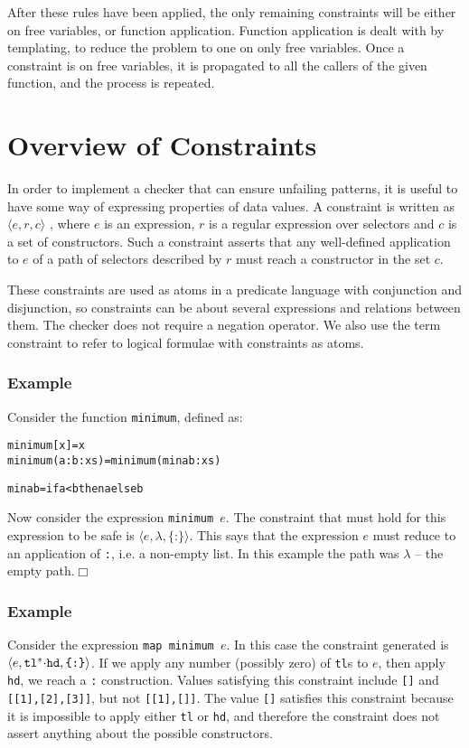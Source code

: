 \documentclass[preprint]{sigplanconf}
\newcommand{\T}[1]{\texttt{#1}}
\newcommand{\tup}[1]{\ensuremath{\langle #1 \rangle}}
\newcounter{exmp}
\newcommand{\yesexample}{\subsubsection*{Example \arabic{exmp}}\addtocounter{exmp}{1}}
\newcommand{\noexample}{\hfill$\Box$}
\newenvironment{code}{\begin{alltt}\small}{\end{alltt}}
\newcommand{\K}{\ensuremath{^\ast}} %
\newcommand{\D}{\ensuremath{\cdot}} %
\renewcommand{\c}[3]{\tup{\T{#1},\T{#2},\T{\{#3\}}}}
\newcommand{\cc}[2]{\c{#1}{$\lambda$}{#2}}
\begin{document}
After these rules have been applied, the only remaining constraints will be
either on free variables, or function application. Function application is
dealt with by templating, to reduce the problem to one on only free variables.
Once a constraint is on free variables, it is propagated to all the callers of
the given function, and the process is repeated.



\section{Overview of Constraints}

In order to implement a checker that can ensure unfailing patterns,
it is useful to have some way of expressing properties of data
values. A constraint is written as $\tup{e,r,c}$ , where $e$ is an
expression, $r$ is a regular expression over selectors and $c$ is a
set of constructors. Such a constraint asserts that any well-defined
application to $e$ of a path of selectors described by $r$ must
reach a constructor in the set $c$.

These constraints are used as atoms in a predicate language with
conjunction and disjunction, so constraints can be about several
expressions and relations between them. The checker does not require
a negation operator. We also use the term constraint to refer to
logical formulae with constraints as atoms.

\yesexample

Consider the function \T{minimum}, defined as:

\begin{code}
minimum [x] = x
minimum (a:b:xs) = minimum (min a b : xs)

min a b = if a < b then a else b
\end{code}

Now consider the expression \T{minimum $e$}. The constraint that
must hold for this expression to be safe is \cc{$e$}{:}. This says
that the expression $e$ must reduce to an application of \T{:}, i.e.
a non-empty list. In this example the path was $\lambda$ -- the
empty path.\noexample

\yesexample

Consider the expression \T{map minimum $e$}. In this case the
constraint generated is \c{$e$}{tl\K\D hd}{:}. If we apply any
number (possibly zero) of \T{tl}s to $e$, then apply \T{hd}, we
reach a \T{:} construction. Values satisfying this constraint
include \T{[]} and \T{[[1],[2],[3]]}, but not \T{[[1],[]]}. The
value \T{[]} satisfies this constraint because it is impossible to
apply either \T{tl} or \T{hd}, and therefore the constraint does not
assert anything about the possible constructors.
\end{document}
